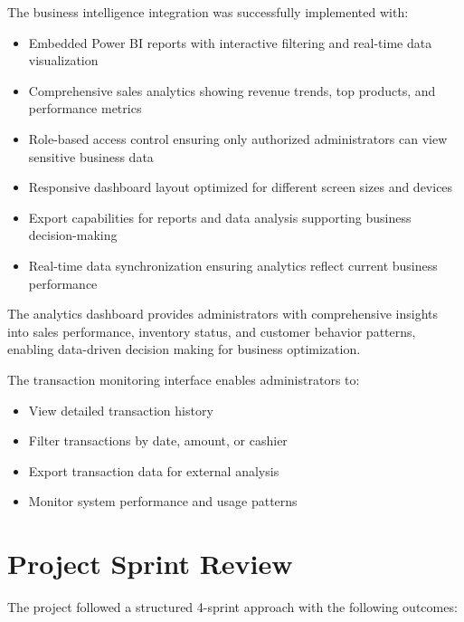 
The business intelligence integration was successfully implemented with:

\begin{itemize}
  \item Embedded Power BI reports with interactive filtering and real-time data visualization
  \item Comprehensive sales analytics showing revenue trends, top products, and performance metrics
  \item Role-based access control ensuring only authorized administrators can view sensitive business data
  \item Responsive dashboard layout optimized for different screen sizes and devices
  \item Export capabilities for reports and data analysis supporting business decision-making
  \item Real-time data synchronization ensuring analytics reflect current business performance
\end{itemize}

The analytics dashboard provides administrators with comprehensive insights into sales performance, inventory status, and customer behavior patterns, enabling data-driven decision making for business optimization.


The transaction monitoring interface enables administrators to:
\begin{itemize}
  \item View detailed transaction history
  \item Filter transactions by date, amount, or cashier
  \item Export transaction data for external analysis
  \item Monitor system performance and usage patterns
\end{itemize}

\section{Project Sprint Review}


The project followed a structured 4-sprint approach with the following outcomes:

